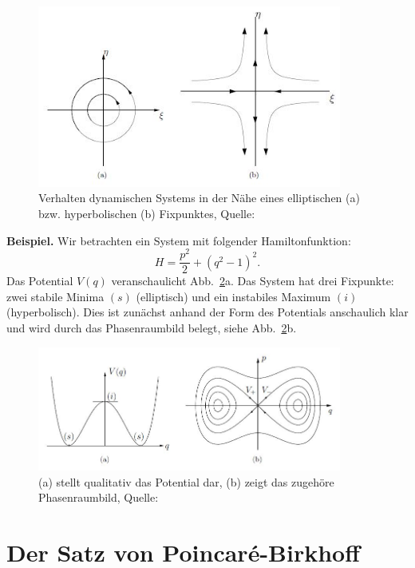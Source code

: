 \documentclass[11pt,a4paper]{article}
\begin{document}
\begin{figure}[h]
\centering
\includegraphics[width=10cm]{klassfixp}
\caption{Verhalten dynamischen Systems in der Nähe eines elliptischen (a) bzw. hyperbolischen (b) Fixpunktes, Quelle: \cite{Wim}}
\label{klassfixp}
\end{figure}
\textbf{Beispiel.} Wir betrachten ein System mit folgender Hamiltonfunktion:
\[ H = \frac{p^2}{2} + (q^2 - 1)^2. \]
Das Potential $ V(q) $ veranschaulicht Abb.~\ref{bspfixp}a. Das System hat drei Fixpunkte: zwei stabile Minima $ (s) $ (elliptisch) und ein instabiles Maximum $ (i) $ (hyperbolisch). Dies ist zunächst anhand der Form des Potentials anschaulich klar und wird durch das Phasenraumbild belegt, siehe Abb.~\ref{bspfixp}b.
\begin{figure}[h]
\centering
\includegraphics[width=10cm]{bspfixp}
\caption{(a) stellt qualitativ das Potential dar, (b) zeigt das zugehöre Phasenraumbild, Quelle: \cite{Wim}}
\label{bspfixp}
\end{figure}


\section{Der Satz von Poincar\'{e}-Birkhoff }
\end{document}
